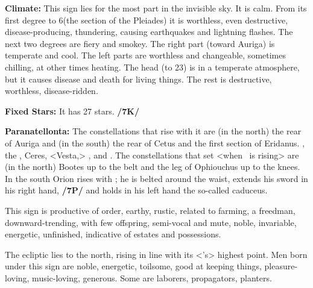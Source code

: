 \textbf{Climate:} This sign lies for the most part in the invisible sky. It is calm. From its first degree to 6\deg (the section of the Pleiades) it is worthless, even destructive, disease-producing, thundering, causing earthquakes and lightning flashes. The next two degrees are fiery and smokey. The right part (toward Auriga) is temperate and cool. The left parts are worthless and changeable, sometimes chilling, at other times heating. The head (to 23\deg) is in a temperate atmosphere, but it causes disease and death for living things. The rest is destructive, worthless, disease-ridden.

\textbf{Fixed Stars:} It has 27 stars. \textbf{/7K/}

\textbf{Paranatellonta:} The constellations that rise with it are (in the north) the rear of Auriga and (in the south) the rear of Cetus and the first section of Eridanus. \Venus, the \Moon, Ceres, <Vesta,> \Mars, and \Mercury. The constellations that set <when \Taurus\, is rising> are (in the north) Bootes up to the belt and the leg of Ophiouchus up to the knees. In the south Orion rises with \Taurus; he is belted around the waist, extends his sword in his right hand, \textbf{/7P/} and holds in his left hand the so-called caduceus.

This sign is productive of order,  earthy, rustic, related to farming, a freedman, downward-trending, with few offspring,  semi-vocal and  mute, noble, invariable, energetic, unfinished, indicative of estates and possessions. 

The ecliptic lies to the north, rising in line with its <\Taurus’s> highest point. Men born under this sign are noble, energetic, toilsome, good at keeping things, pleasure-loving, music-loving, generous. Some are laborers, propagators, planters. 


